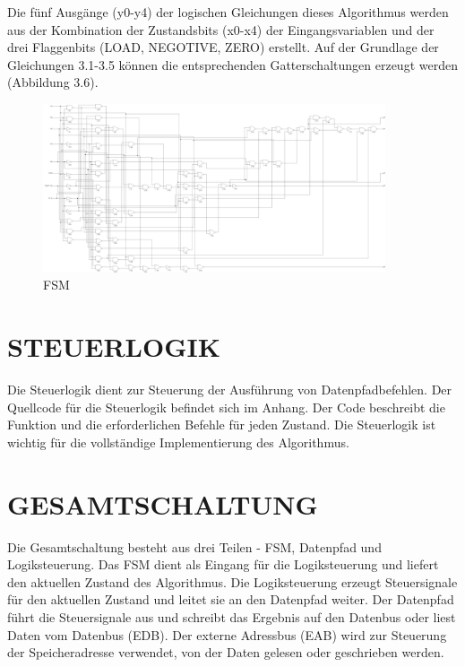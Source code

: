 Die fünf Ausgänge (y0-y4) der logischen Gleichungen dieses Algorithmus werden aus der Kombination der Zustandsbits (x0-x4) der Eingangsvariablen und der drei Flaggenbits (LOAD, NEGOTIVE, ZERO) erstellt. Auf der Grundlage der Gleichungen 3.1-3.5 können die entsprechenden Gatterschaltungen erzeugt werden (Abbildung 3.6).

\vspace{\baselineskip}

\begin{figure}[H]
  \centering
  \includegraphics[width=0.9\textwidth]{images/FSM.png}
  \caption[FSM]{FSM}
  \label{fig:FSM}
\end{figure}

\section{STEUERLOGIK}

Die Steuerlogik dient zur Steuerung der Ausführung von Datenpfadbefehlen. Der Quellcode für die Steuerlogik befindet sich im Anhang. Der Code beschreibt die Funktion und die erforderlichen Befehle für jeden Zustand. Die Steuerlogik ist wichtig für die vollständige Implementierung des Algorithmus.

\section{GESAMTSCHALTUNG}

Die Gesamtschaltung besteht aus drei Teilen - FSM, Datenpfad und Logiksteuerung. Das FSM dient als Eingang für die Logiksteuerung und liefert den aktuellen Zustand des Algorithmus. Die Logiksteuerung erzeugt Steuersignale für den aktuellen Zustand und leitet sie an den Datenpfad weiter. Der Datenpfad führt die Steuersignale aus und schreibt das Ergebnis auf den Datenbus oder liest Daten vom Datenbus (EDB). Der externe Adressbus (EAB) wird zur Steuerung der Speicheradresse verwendet, von der Daten gelesen oder geschrieben werden.

